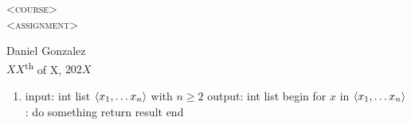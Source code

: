 \documentclass[12pt, a4paper]{article}
\renewcommand{\geq}{\geqslant}
\DeclarePairedDelimiter \brackets{\langle}{\rangle}
\begin{document}
\begin{center}
    \textsc{\huge <course>}\\
    \textsc{\large <assignment>}\\
\end{center}
\begin{flushright}
    Daniel Gonzalez\\
    $XX$\textsuperscript{th} of X, $202X$
\end{flushright}

\begin{enumerate}
    \item
\begin{algorithm}[caption={placeholder}, label={alg:placeholder}]
    input:  int list $\brackets*{x_1, \dots x_n}$ with $n \geq 2$
    output: int list
    begin
        for $x$ in $\brackets*{x_1, \dots x_n}$:
            do something
        return result
    end
\end{algorithm}

\end{enumerate}
\end{document}
